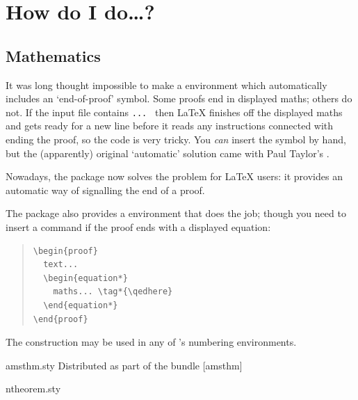 
\section{How do I do\dots{}?}

\subsection{Mathematics}


It was long thought impossible to make a 
environment which automatically includes an `end-of-proof' symbol.
Some proofs end in displayed maths; others do not.  If the input file
contains %
\texttt{...\csx{]} } then \LaTeX{} finishes off
the displayed maths and gets ready for a new line before it reads any
instructions connected with ending the proof, so the code is very
tricky.  You \emph{can} insert the symbol by hand, but the
(apparently) original `automatic' solution came with Paul Taylor's
.

Nowadays, the  package now solves the problem for
\LaTeX{} users: it provides an automatic way of signalling
the end of a proof.

The \AMSLaTeX{} package  also provides a
 environment that does the job; though you need to
insert a  command if the proof ends with a displayed
equation:
\begin{quote}
\begin{verbatim}
\begin{proof}
  text...
  \begin{equation*}
    maths... \tag*{\qedhere}
  \end{equation*}
\end{proof}
\end{verbatim}
\end{quote}
The  construction may be used in any of
\AMSLaTeX{}'s numbering environments.
\begin{ctanrefs}
\item[amsthm.sty]Distributed as part of the \AMSLaTeX{} bundle
  [amsthm]
\item[ntheorem.sty]
\end{ctanrefs}

